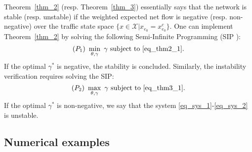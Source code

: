 Theorem~\ref{thm_2} (resp. Theorem~\ref{thm_3}) essentially says that the network is stable (resp. unstable) if the weighted expected net flow is negative (resp. non-negative) over the traffic state space $\{x\in\mathcal{X}|x_{e_0}=x_{e_0}^c\}$. One can implement Theorem~\ref{thm_2} by solving the following Semi-Infinite Programming (SIP \cite{stein2012solve}):
\begin{equation*}
    (P_1)~ \min_{\theta,\gamma}~\gamma~\text{subject to}~\eqref{eq_thm2_1}.
\end{equation*}
If the optimal $\gamma^*$ is negative, the stability is concluded. Similarly, the instability verification requires solving the SIP: 
\begin{equation*}
    (P_2)~ \max_{\theta,\gamma}~\gamma~\text{subject to}~\eqref{eq_thm3_1}.
\end{equation*}
If the optimal $\gamma^*$ is non-negative, we say that the system \eqref{eq_sys_1}-\eqref{eq_sys_2} is unstable.

\subsection{Numerical examples}

